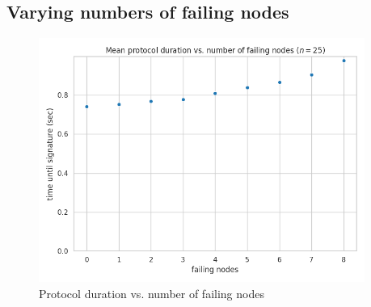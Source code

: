 \subsection*{Varying numbers of failing nodes}

\begin{figure}[H]
    \centering
    \includegraphics[width=0.95\textwidth]{figures/3/round_wall_sum_by_failing.png}
    \captionsetup{labelformat=empty}
    \caption{Protocol duration vs. number of failing nodes}
\end{figure}

